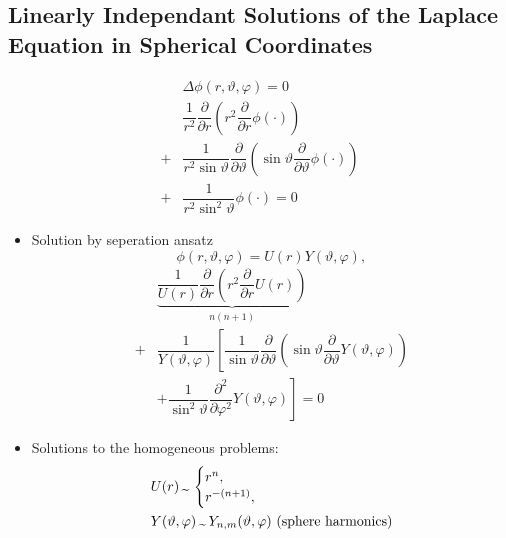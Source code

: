\subsection{Linearly Independant Solutions of the Laplace Equation in Spherical Coordinates}
\begin{align*}
  &\Delta\phi(r,\vartheta, \varphi) = 0\\
  &\dfrac{1}{r^{2}}\dfrac{\partial}{\partial r}\left(r^{2} \dfrac{\partial}{\partial r} \phi(\cdot)\right)\\
  + &\dfrac{1}{r^{2}\sin\vartheta} \dfrac{\partial}{\partial\vartheta} \left(\sin\vartheta \dfrac{\partial}{\partial\vartheta} \phi(\cdot)\right)\\
  + &\dfrac{1}{r^{2}\sin^{2}\vartheta} \phi(\cdot) = 0
\end{align*}
\begin{itemize}
        \item Solution by seperation ansatz
        \begin{equation*}
          \phi(r,\vartheta,\varphi) = U(r)Y(\vartheta, \varphi),
        \end{equation*}
        \begin{align*}
          &\underbrace{\dfrac{1}{U(r)} \dfrac{\partial}{\partial r} \left(r^{2} \dfrac{\partial}{\partial r} U(r)\right)}_{n(n+1)}\\
          + &\dfrac{1}{Y(\vartheta,\varphi)} \left[ \dfrac{1}{\sin\vartheta} \dfrac{\partial}{\partial\vartheta} \left(\sin\vartheta \dfrac{\partial}{\partial\vartheta} Y(\vartheta, \varphi)\right)\right.\\
          &\left.+ \dfrac{1}{\sin^{2}\vartheta} \dfrac{\partial^{2}}{\partial\varphi^{2}} Y(\vartheta, \varphi) \right] = 0
        \end{align*}
  \item Solutions to the homogeneous problems:
        \begin{align*}
          &U(r) \,\text{\texttildelow}\, \begin{cases}r^{n},\\ r^{-(n+1)},\end{cases}\\
          &Y(\vartheta,\varphi) \,\text{\texttildelow}\, Y_{n,m}(\vartheta,\varphi)\text{ (sphere harmonics)}\\
        \end{align*}
\end{itemize}
